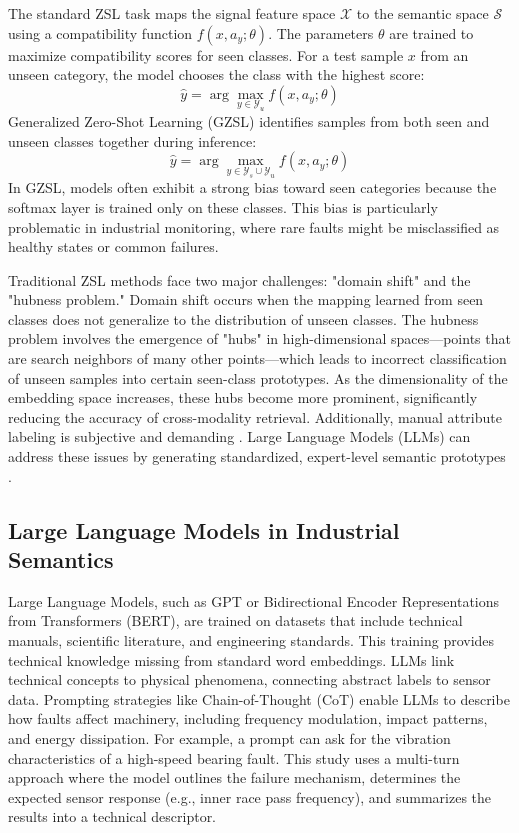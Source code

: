 \documentclass[journal]{IEEEtran}
\begin{document}
The standard ZSL task maps the signal feature space $\mathcal{X}$ to the semantic space $\mathcal{S}$ using a compatibility function $f(x, a_y; \theta)$. The parameters $\theta$ are trained to maximize compatibility scores for seen classes. For a test sample $x$ from an unseen category, the model chooses the class with the highest score:
\begin{equation}
\hat{y} = \arg\max_{y \in \mathcal{Y}_u} f(x, a_y; \theta)
\end{equation}
Generalized Zero-Shot Learning (GZSL) identifies samples from both seen and unseen classes together during inference:
\begin{equation}
\hat{y} = \arg\max_{y \in \mathcal{Y}_s \cup \mathcal{Y}_u} f(x, a_y; \theta)
\end{equation}
In GZSL, models often exhibit a strong bias toward seen categories because the softmax layer is trained only on these classes. This bias is particularly problematic in industrial monitoring, where rare faults might be misclassified as healthy states or common failures.

Traditional ZSL methods face two major challenges: "domain shift" and the "hubness problem." Domain shift occurs when the mapping learned from seen classes does not generalize to the distribution of unseen classes. The hubness problem involves the emergence of "hubs" in high-dimensional spaces—points that are search neighbors of many other points—which leads to incorrect classification of unseen samples into certain seen-class prototypes. As the dimensionality of the embedding space increases, these hubs become more prominent, significantly reducing the accuracy of cross-modality retrieval. Additionally, manual attribute labeling is subjective and demanding \cite{palatucci2009zero, lampert2009learning}. Large Language Models (LLMs) can address these issues by generating standardized, expert-level semantic prototypes \cite{xian2018zero}.

\subsection{Large Language Models in Industrial Semantics}
Large Language Models, such as GPT or Bidirectional Encoder Representations from Transformers (BERT), are trained on datasets that include technical manuals, scientific literature, and engineering standards. This training provides technical knowledge missing from standard word embeddings. LLMs link technical concepts to physical phenomena, connecting abstract labels to sensor data. Prompting strategies like Chain-of-Thought (CoT) enable LLMs to describe how faults affect machinery, including frequency modulation, impact patterns, and energy dissipation. For example, a prompt can ask for the vibration characteristics of a high-speed bearing fault. This study uses a multi-turn approach where the model outlines the failure mechanism, determines the expected sensor response (e.g., inner race pass frequency), and summarizes the results into a technical descriptor.
\end{document}

